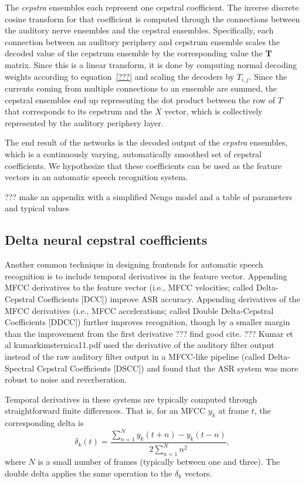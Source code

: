 The \textit{cepstra} ensembles
each represent one cepstral coefficient.
The inverse discrete cosine transform
for that coefficient is computed
through the connections between
the auditory nerve ensembles
and the cepstral ensembles.
Specifically, each connection
between an auditory periphery
and cepstrum ensemble
scales the decoded value of the
cepstrum ensemble by
the corresponding value
the $\mathbf{T}$ matrix.
Since this is a linear transform,
it is done by computing
normal decoding weights
according to equation~\eqref{???}
and scaling the decoders by $T_{i,j}$.
Since the currents coming from
multiple connections to an ensemble
are summed, the cepstral ensembles
end up representing the
dot product between the row of
$T$ that corresponds to its cepstrum
and the $X$ vector,
which is collectively represented
by the auditory periphery layer.

The end result of the networks
is the decoded output
of the \textit{cepstra} ensembles,
which is a continuously varying,
automatically smoothed set of cepstral coefficients.
We hypothesize that these coefficients can be used
as the feature vectors in an
automatic speech recognition system.

??? make an appendix with a simplified Nengo model
and a table of parameters and typical values

\subsection{Delta neural cepstral coefficients}

Another common technique in designing frontends
for automatic speech recognition is to
include temporal derivatives
in the feature vector.
Appending MFCC derivatives
to the feature vector
(i.e., MFCC velocities;
called Delta-Cepstral Coefficients [DCC])
improve ASR accuracy.
Appending derivatives of the MFCC derivatives
(i.e., MFCC accelerations;
called Double Delta-Cepstral Coefficients [DDCC])
further improves recognition,
though by a smaller margin than
the improvement from the first derivative
??? find good cite.
??? Kumar et al kumarkimsternica11.pdf
used the derivative of the auditory filter output
instead of the raw auditory filter output
in a MFCC-like pipeline
(called Delta-Spectral Cepstral Coefficients [DSCC])
and found that the ASR system
was more robust to noise and reverberation.

Temporal derivatives in these systems
are typically computed through straightforward
finite differences.
That is, for an MFCC $y_k$
at frame $t$, the corresponding delta is
\begin{equation}
  \label{dcc}
  \delta_k(t) = \frac{\sum_{n=1}^N y_k(t+n) - y_k(t-n)}{
    2 \sum_{n=1}^N n^2},
\end{equation}
where $N$ is a small number of frames
(typically between one and three).
The double delta applies the same operation
to the $\delta_k$ vectors.

